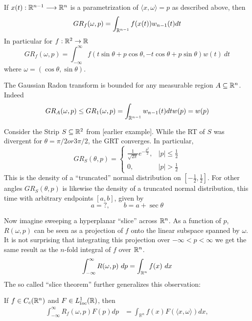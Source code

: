 \begin{myexample}
  If $x(t):\mathbb{R}^{n-1} \longrightarrow \mathbb{R}^n$ is a parametrization of $\langle x, \omega\rangle = p$ as described above, then
  \[
    GR_f(\omega, p) = \int_{\mathbb{R}^{n-1}}f(x(t)) w_{n-1}(t) dt
  \]
  In particular for $f:\mathbb{R}^2 \rightarrow \mathbb{R}$
  \[
    GR_f(\omega, p) = \int_{-\infty}^\infty f(t \sin \theta + p \cos \theta, -t \cos \theta + p \sin \theta) w(t)~dt
  \]
  where $\omega = (\cos \theta, \sin \theta)$.
\end{myexample}

\begin{myexample}
  The Gaussian Radon transform is bounded for any measurable region $A \subseteq \mathbb{R}^n$. Indeed 
  \[
      GR_A(\omega, p) \leq GR_1(\omega, p) = \int_{\mathbb{R}^{n-1}} w_{n-1}(t)dt w(p) = w(p)
  \]
\end{myexample}

\begin{myexample}
  Consider the Strip $S \subseteq \mathbb{R}^2$ from [earlier example]. While the RT of $S$ was divergent for $\theta = \pi/2 or 3\pi/2$, the GRT converges. In particular,
  \[
    GR_S(\theta, p)
    = \begin{cases}
      \frac1{\sqrt{2\pi}}e^{-\frac{p^2}2}, & |p| \leq \frac12 \\
      0, & |p| > \frac12
    \end{cases}
  \]
  This is the density of a ``truncated'' normal distribution on $[-\frac12,\frac12]$. For other angles $GR_S(\theta, p)$ is likewise the density of a truncated normal distribution, this time with arbitrary endpoints $[a, b]$, given by
  \[
    a = ?, \qquad b = a + \sec\theta
  \]
\end{myexample}

Now imagine sweeping a hyperplanar ``slice'' across $\mathbb{R}^n$. As a function of $p$, $R(\omega, p)$ can be seen as a projection of $f$ onto the linear subspace spanned by $\omega$. It is not surprising that integrating this projection over $-\infty < p < \infty$ we get the same result as the $n$-fold integral of $f$ over $\mathbb{R}^n$.
\[
    \int_{-\infty}^\infty R(\omega, p) ~dp = \int_{\mathbb{R}^n} f(x) ~dx
\]
The so called ``slice theorem'' further generalizes this observation:

\begin{proposition}[Slice Theorem]
  If $f \in C_c(\mathbb{R}^n)$ and $F \in L^1_{loc}(\mathbb{R})$, then
  \begin{align}
    \label{eq:ST}
    \int_{-\infty}^\infty R_f(\omega, p) F(p) dp 
    &= \int_{\mathbb{R}^n} f(x) F(\langle x, \omega \rangle) dx,
  \end{align}
\end{proposition}

